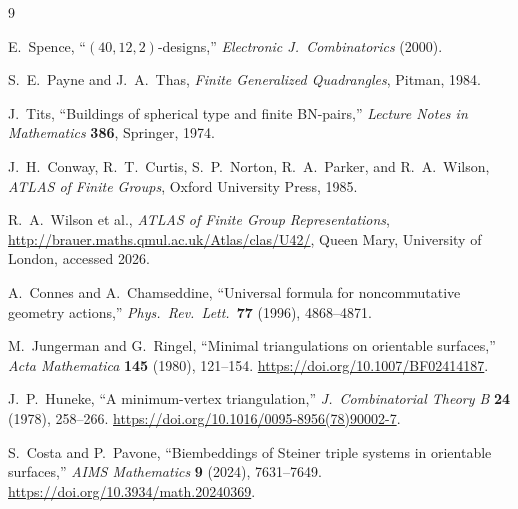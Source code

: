 \documentclass[12pt,a4paper]{article}
\theoremstyle{definition}
\begin{document}
\begin{thebibliography}{9}

  E.~Spence,
  ``$(40,12,2)$-designs,''
  \textit{Electronic J.\ Combinatorics} (2000).

  S.~E.~Payne and J.~A.~Thas,
  \textit{Finite Generalized Quadrangles},
  Pitman, 1984.

  J.~Tits,
  ``Buildings of spherical type and finite BN-pairs,''
  \textit{Lecture Notes in Mathematics} \textbf{386}, Springer, 1974.

  J.~H.~Conway, R.~T.~Curtis, S.~P.~Norton, R.~A.~Parker, and R.~A.~Wilson,
  \textit{ATLAS of Finite Groups},
  Oxford University Press, 1985.

  R.~A.~Wilson et al.,
  \textit{ATLAS of Finite Group Representations},
  \url{http://brauer.maths.qmul.ac.uk/Atlas/clas/U42/},
  Queen Mary, University of London, accessed 2026.

  A.~Connes and A.~Chamseddine,
  ``Universal formula for noncommutative geometry actions,''
  \textit{Phys.\ Rev.\ Lett.}\ \textbf{77} (1996), 4868--4871.

  M.~Jungerman and G.~Ringel,
  ``Minimal triangulations on orientable surfaces,''
  \textit{Acta Mathematica} \textbf{145} (1980), 121--154.
  \url{https://doi.org/10.1007/BF02414187}.

  J.~P.~Huneke,
  ``A minimum-vertex triangulation,''
  \textit{J.\ Combinatorial Theory B} \textbf{24} (1978), 258--266.
  \url{https://doi.org/10.1016/0095-8956(78)90002-7}.

  S.~Costa and P.~Pavone,
  ``Biembeddings of Steiner triple systems in orientable surfaces,''
  \textit{AIMS Mathematics} \textbf{9} (2024), 7631--7649.
  \url{https://doi.org/10.3934/math.20240369}.

\end{thebibliography}
\end{document}

